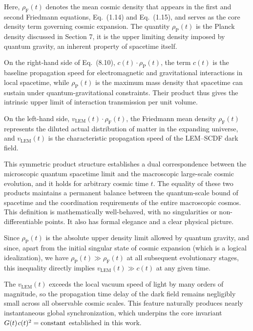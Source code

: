 \documentclass[12pt,leqno]{article}
\newcommand{\tinysp}{\mspace{1.5mu}}
\begin{document}
	\smallskip
	Here, $\rho_{\scriptscriptstyle\mathrm{F}}(t)$ denotes the mean cosmic density that appears in the first and second Friedmann equations, Eq.~(1.14) and Eq.~(1.15), and serves as the core density term governing cosmic expansion. The quantity $\rho_{\scriptscriptstyle\mathrm{P}}(t)$ is the Planck density discussed in Section 7, it is the upper limiting density imposed by quantum gravity, an inherent property of spacetime itself.
	
	\medskip
	On the right-hand side of Eq.~(8.10), $c(t)\cdot\rho_{\scriptscriptstyle\mathrm{P}}(t)$, the term $c(t)$ is the baseline propagation speed for electromagnetic and gravitational interactions in local spacetime, while $\rho_{\scriptscriptstyle\mathrm{P}}(t)$ is the maximum mass density that spacetime can sustain under quantum-gravitational constraints. Their product thus gives the intrinsic upper limit of interaction transmission per unit volume.
	
	\medskip
	On the left-hand side, $v_{\scriptscriptstyle\mathrm{LEM}}(t)\cdot\rho_{\scriptscriptstyle\mathrm{F}}(t)$, the Friedmann mean density $\rho_{\scriptscriptstyle\mathrm{F}}(t)$ represents the diluted actual distribution of matter in the expanding universe, and $v_{\scriptscriptstyle\mathrm{LEM}}(t)$ is the characteristic propagation speed of the LEM--SCDF dark field.
	
	\medskip
	This symmetric product structure establishes a dual correspondence between the microscopic quantum spacetime limit and the macroscopic large-scale cosmic evolution, and it holds for arbitrary cosmic time $t$. The equality of these two products maintains a permanent balance between the quantum-scale bound of spacetime and the coordination requirements of the entire macroscopic cosmos. This definition is mathematically well-behaved, with no singularities or non-differentiable points. It also has formal elegance and a clear physical picture.
	
	\medskip
	Since $\rho_{\scriptscriptstyle\mathrm{P}}(t)$ is the absolute upper density limit allowed by quantum gravity, and since, apart from the initial singular state of cosmic expansion (which is a logical idealization), we have $\rho_{\scriptscriptstyle\mathrm{P}}(t) \gg \rho_{\scriptscriptstyle\mathrm{F}}(t)$ at all subsequent evolutionary stages, this inequality directly implies $v_{\scriptscriptstyle\mathrm{LEM}}(t) \gg c(t)$ at any given time.
	
	\medskip
	The $v_{\scriptscriptstyle\mathrm{LEM}}(t)$ exceeds the local vacuum speed of light by many orders of magnitude, so the propagation time delay of the dark field remains negligibly small across all observable cosmic scales. This feature naturally produces nearly instantaneous global synchronization, which underpins the core invariant $G(t)\tinysp c(t)^2=\text{constant}$ established in this work.
	
\end{document}
